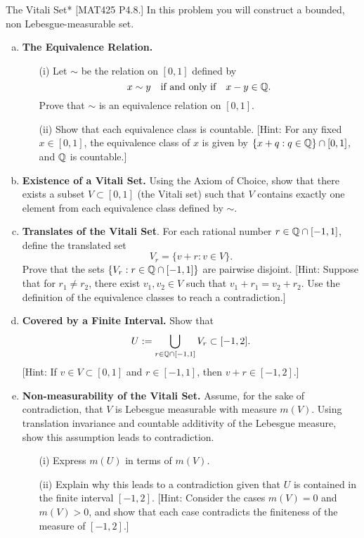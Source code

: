 \begin{problem}{The Vitali Set}*
    [MAT425 P4.8.] In this problem you will construct a bounded, non Lebesgue-measurable set.

    \begin{enumerate}[(a)]
        \itemsep0em 
        \item \textbf{The Equivalence Relation.}
        \begin{itemize}
            \item[(i)] Let \(\sim\) be the relation on \([0,1]\) defined by
            \[
                x \sim y \quad \text{if and only if} \quad x - y \in \mathbb{Q}.
            \]
            Prove that \(\sim\) is an equivalence relation on \([0,1]\).
            \item[(ii)] Show that each equivalence class is countable. [Hint: For any fixed \(x \in [0,1]\), the equivalence class of \(x\) is given by \(\{x + q : q \in \mathbb{Q} \} \cap [0,1]\), and \(\mathbb{Q}\) is countable.]
        \end{itemize}
        \item \textbf{Existence of a Vitali Set.} Using the Axiom of Choice, show that there exists a subset \(V \subset [0,1]\) (the Vitali set) such that \(V\) contains exactly one element from each equivalence class defined by \(\sim\). 
        \item \textbf{Translates of the Vitali Set}. For each rational number \(r \in \mathbb{Q} \cap [-1,1]\), define the translated set
        \[
            V_r = \{ v + r : v \in V \}.
        \]
        Prove that the sets \(\{V_r : r \in \mathbb{Q} \cap [-1,1]\}\) are pairwise disjoint. [Hint: Suppose that for \(r_1 \ne r_2\), there exist \(v_1, v_2 \in V\) such that \(v_1 + r_1 = v_2 + r_2\). Use the definition of the equivalence classes to reach a contradiction.] 
        \item \textbf{Covered by a Finite Interval.} Show that
        \[
            U := \bigcup_{r \in \mathbb{Q} \cap [-1,1]} V_r \subset [-1,2].
        \]
        [Hint: If \(v \in V \subset [0,1]\) and \(r \in [-1,1]\), then \(v + r \in [-1,2]\).] 
        \item \textbf{Non-measurability of the Vitali Set.} Assume, for the sake of contradiction, that \(V\) is Lebesgue measurable with measure \(m(V)\). Using translation invariance and countable additivity of the Lebesgue measure, show this assumption leads to contradiction.
        \begin{itemize}
            \item[(i)] Express \(m(U)\) in terms of \(m(V)\).
            \item[(ii)] Explain why this leads to a contradiction given that \(U\) is contained in the finite interval \([-1,2]\). [Hint: Consider the cases \(m(V) = 0\) and \(m(V) > 0\), and show that each case contradicts the finiteness of the measure of \([-1,2]\).]
        \end{itemize}
    \end{enumerate}
\end{problem}


